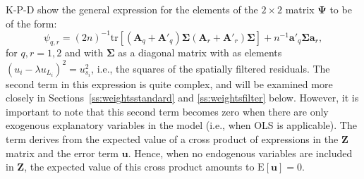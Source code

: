 \documentclass{article}
\begin{document}
K-P-D show the general expression for the elements of the $2 \times 2$ matrix $\mathbf{\Psi}$ to
be of the form:
\begin{equation}\label{eq:psiqr}
\psi_{q,r} = (2n)^{-1} \mbox{tr} [ (\mathbf{A}_q + \mathbf{A'}_q ) \mathbf{\mathbf{\Sigma}}  (\mathbf{A}_r + \mathbf{A'}_r ) \mathbf{\Sigma} ] + n^{-1} \mathbf{a'}_q \mathbf{\Sigma} \mathbf{a}_r,
\end{equation}
for $q, r = 1,2$ and with $\mathbf{\Sigma}$ as a diagonal matrix with as elements 
$(u_i - \lambda u_{L_i})^2 = u_{s_i}^2$, i.e., the squares of the spatially filtered residuals.
The second term in this expression is quite complex, and will be examined more closely 
in Sections~\ref{ss:weightsstandard} and \ref{ss:weightsfilter} below.
However, it is important to note that this second term becomes zero when there are only exogenous
explanatory variables in the model (i.e., when OLS is applicable). The term derives from the
expected value of a cross
product of expressions in the $\mathbf{Z}$ matrix and the error term $\mathbf{u}$. Hence,
when no endogenous variables are included in $\mathbf{Z}$, the expected value of this
cross product amounts to $\mbox{E}[ \mathbf{u} ] = 0$.
\end{document}
